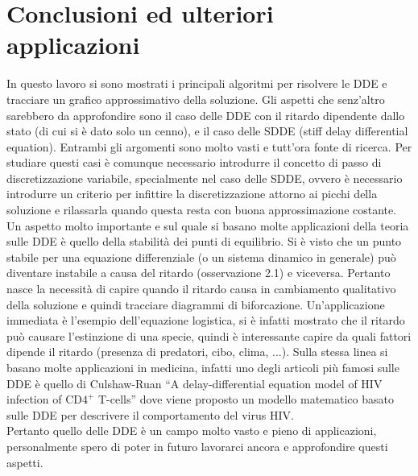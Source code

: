 \chapter*{Conclusioni ed ulteriori applicazioni}

In questo lavoro si sono mostrati i principali algoritmi per risolvere le DDE e tracciare un grafico approssimativo della soluzione.
Gli aspetti che senz'altro sarebbero da approfondire sono il caso delle DDE con il ritardo dipendente dallo stato (di cui si è dato solo un cenno), 
e il caso delle SDDE (stiff delay differential equation). Entrambi gli argomenti sono molto vasti e tutt'ora fonte di ricerca.
Per studiare questi casi è comunque necessario introdurre il concetto di passo di discretizzazione variabile, specialmente nel caso delle SDDE, 
ovvero è necessario introdurre un criterio per infittire la discretizzazione attorno ai picchi della soluzione e rilassarla quando questa 
resta con buona approssimazione costante.\\[0.5cm]
Un aspetto molto importante e sul quale si basano molte applicazioni della teoria sulle DDE è quello della stabilità dei punti di equilibrio.
Si è visto che un punto stabile per una equazione differenziale (o un sistema dinamico in generale) può diventare instabile 
a causa del ritardo (osservazione 2.1) e viceversa. Pertanto nasce la necessità di capire quando il ritardo causa in cambiamento 
qualitativo della soluzione e quindi tracciare diagrammi di biforcazione. Un'applicazione immediata è l'esempio dell'equazione logistica, 
si è infatti mostrato che il ritardo può causare l'estinzione di una specie, quindi è interessante capire da quali fattori dipende 
il ritardo (presenza di predatori, cibo, clima, ...). Sulla stessa linea si basano molte applicazioni in medicina, infatti uno degli 
articoli più famosi sulle DDE è quello di Culshaw-Ruan ``A delay-differential equation model of HIV infection of $\mbox{CD4}^+$ T-cells''  
dove viene proposto un modello matematico basato sulle DDE per descrivere il comportamento del virus HIV.\\[0.3cm]
Pertanto quello delle DDE è un campo molto vasto e pieno di applicazioni, personalmente spero di poter in futuro lavorarci ancora 
e approfondire questi aspetti.
